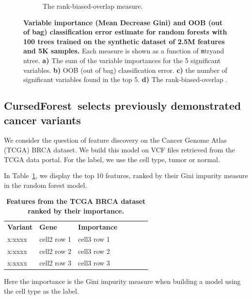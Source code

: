 \documentclass[10pt,letterpaper]{article}
\newlength\savedwidth
\newcommand\thickhline{\noalign{\global\savedwidth\arrayrulewidth\global\arrayrulewidth 2pt}%
\hline
\noalign{\global\arrayrulewidth\savedwidth}}
\newcommand{\cursedforest}{{\sc CursedForest}}
\newcommand{\mtry}{{\texttt mtry}}
\begin{document}
\begin{figure}[tbhp]
\begin{adjustwidth}{-1.00in}{0in}
\begin{subfigure}[b]{0.5\linewidth}
    \caption{The  rank-biased-overlap measure.} 
    \label{fig7:b} 
    \vspace{4ex}
  \end{subfigure} 
  \caption{{\bf Variable importance (Mean Decrease Gini) and OOB (out of bag) classification error estimate for random
      forests with 100 trees trained on the synthetic dataset of 2.5M features and 5K samples.}  Each measure is shown
    as a function of \mtry and ntree. {\bf a)} The sum of the variable importances for the 5 significant variables.  {\bf
      b)} OOB (out of bag) classification error. {\bf c)} the number of significant variables found in the top 5. 
     {\bf d)} The rank-biased-overlap \cite[]{Webber.et.al.2010}. }
  \label{figure:synth}
\end{adjustwidth}
\end{figure}




\subsection{\cursedforest\ selects previously demonstrated cancer variants}
We consider the question of feature discovery on the Cancer Genome Atlas (TCGA) BRCA dataset.  We build this model on
VCF files retrieved from the TCGA data portal.  For the label, we use the cell type, tumor or normal.

In Table~\ref{table3}, we display the top 10 features, ranked by their Gini impurity measure in the random forest model.

\begin{table}[!ht]
\centering
\caption{
{\bf Features from the TCGA BRCA dataset ranked by their importance.}}
\begin{tabular}{|l|l|l|l|l|l|l|}
\hline
{\bf Variant} & {\bf Gene} & {\bf Importance}\\ \thickhline
x:xxxx & cell2 row 1 & cell3 row 1\\ \hline
x:xxxx & cell2 row 2 & cell3 row 2\\ \hline
x:xxxx & cell2 row 3 & cell3 row 3\\ \hline
\end{tabular}
\begin{flushleft} Here the importance is the Gini impurity measure when building a model using the cell type as the label.
\end{flushleft}
\label{table3}
\end{table}
\end{document}
